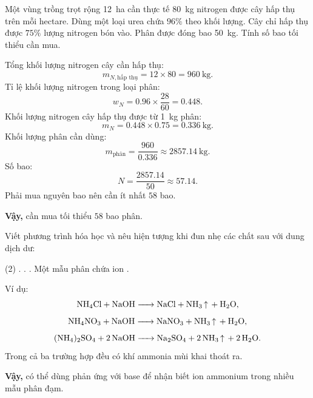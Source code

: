 \begin{vidu}
Một vùng trồng trọt rộng \SI{12}{\hectare} cần thực tế \SI{80}{\kilo\gram} nitrogen được cây hấp thụ trên mỗi hectare. Dùng một loại urea chứa $96\%$  theo khối lượng. Cây chỉ hấp thụ được $75\%$ lượng nitrogen bón vào. Phân được đóng bao \SI{50}{\kilo\gram}. Tính số bao tối thiểu cần mua.
\end{vidu}
\begin{loigiai}
Tổng khối lượng nitrogen cây cần hấp thụ:
\[
m_{N,\text{hấp thụ}}=12\times80=\SI{960}{\kilo\gram}.
\]
Tỉ lệ khối lượng nitrogen trong loại phân:
\[
w_N=0.96\times\frac{28}{60}=0.448.
\]
Khối lượng nitrogen cây hấp thụ được từ \SI{1}{\kilo\gram} phân:
\[
m_N=0.448\times0.75=\SI{0.336}{\kilo\gram}.
\]
Khối lượng phân cần dùng:
\[
m_{\text{phân}}=\frac{960}{0.336}\approx\SI{2857.14}{\kilo\gram}.
\]
Số bao:
\[
N=\frac{2857.14}{50}\approx57.14.
\]
Phải mua nguyên bao nên cần ít nhất $58$ bao.

\textbf{Vậy,} cần mua tối thiểu $58$ bao phân.
\end{loigiai}

\begin{tuluyen}
Viết phương trình hóa học và nêu hiện tượng khi đun nhẹ các chất sau với dung dịch  dư:
\begin{tasks}(2)
\task {}.
\task {}.
\task {}.
\task Một mẫu phân chứa ion .
\end{tasks}
\begin{loigiaiBT}
Ví dụ:
\[
\ce{NH4Cl + NaOH -> NaCl + NH3 ^ + H2O},
\]
\[
\ce{NH4NO3 + NaOH -> NaNO3 + NH3 ^ + H2O},
\]
\[
\ce{(NH4)2SO4 + 2NaOH -> Na2SO4 + 2NH3 ^ + 2H2O}.
\]
Trong cả ba trường hợp đều có khí ammonia mùi khai thoát ra.

\textbf{Vậy,} có thể dùng phản ứng với base để nhận biết ion ammonium trong nhiều mẫu phân đạm.
\end{loigiaiBT}
\end{tuluyen}
